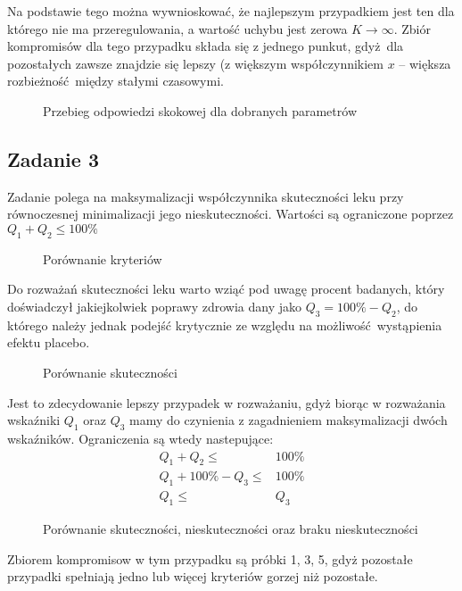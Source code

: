 \documentclass[a4paper, 12pt]{article}
\begin{document}
            Na podstawie tego można wywnioskować, że najlepszym przypadkiem jest ten dla którego nie ma 
            przeregulowania, a wartość uchybu jest zerowa $K \to \infty$. Zbiór kompromisów dla tego
            przypadku składa się z jednego punkut, gdyż dla pozostałych zawsze znajdzie się lepszy
            (z większym współczynnikiem $x$ -- większa rozbieżność między stałymi czasowymi. 
            \begin{figure}[H]
                \centering
                \def \svgwidth{0.7\columnwidth}
                
                \caption{Przebieg odpowiedzi skokowej dla dobranych parametrów}
            \end{figure}\noindent
        \subsection{Zadanie 3}
            Zadanie polega na maksymalizacji współczynnika skuteczności leku przy równoczesnej
            minimalizacji jego nieskuteczności. Wartości są ograniczone poprzez $Q_1 + Q_2 \leq 100\%$
            \begin{figure}[H]
                \centering
                \def \svgwidth{0.7\columnwidth}
                
                \caption{Porównanie kryteriów}
            \end{figure}\noindent
            Do rozważań skuteczności leku warto wziąć pod uwagę procent badanych, który doświadczył
            jakiejkolwiek poprawy zdrowia dany jako $Q_3 = 100\% - Q_2$, do którego należy jednak 
            podejść krytycznie ze względu na możliwość wystąpienia efektu placebo.
            \begin{figure}[H]
                \centering
                \def \svgwidth{0.7\columnwidth}
                
                \caption{Porównanie skuteczności}
            \end{figure}\noindent
            Jest to zdecydowanie lepszy przypadek w rozważaniu, gdyż biorąc w rozważania wskaźniki $Q_1$
            oraz $Q_3$ mamy do czynienia z zagadnieniem maksymalizacji dwóch wskaźników. Ograniczenia są
            wtedy nastepujące:
            $$
                \begin{aligned}
                    Q_1 + Q_2 \leq& 100\% \\
                    Q_1 + 100\% - Q_3 \leq& 100\% \\
                    Q_1 \leq& Q_3
                \end{aligned}
            $$
            \begin{figure}[H]
                \centering
                \def \svgwidth{0.7\columnwidth}
                
                \caption{Porównanie skuteczności, nieskuteczności oraz braku nieskuteczności}
            \end{figure}\noindent
            Zbiorem kompromisow w tym przypadku są próbki 1, 3, 5, gdyż pozostałe przypadki spełniają 
            jedno lub więcej kryteriów gorzej niż pozostałe.
\end{document}
